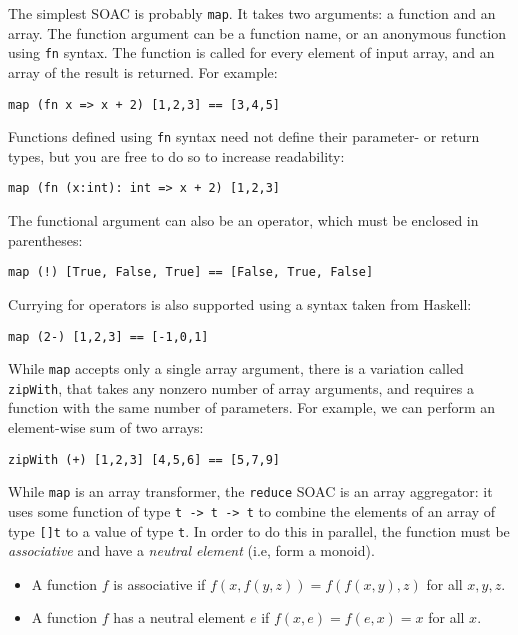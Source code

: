 \documentclass[11pt]{book}
\begin{document}
The simplest SOAC is probably \texttt{map}.  It takes two arguments: a
function and an array.  The function argument can be a function name,
or an anonymous function using \texttt{fn} syntax.  The function is
called for every element of input array, and an array of the result is
returned.  For example:

\begin{lstlisting}
map (fn x => x + 2) [1,2,3] == [3,4,5]
\end{lstlisting}

Functions defined using \texttt{fn} syntax need not define their
parameter- or return types, but you are free to do so to increase
readability:

\begin{lstlisting}
map (fn (x:int): int => x + 2) [1,2,3]
\end{lstlisting}

The functional argument can also be an operator, which must be
enclosed in parentheses:

\begin{lstlisting}
map (!) [True, False, True] == [False, True, False]
\end{lstlisting}

Currying for operators is also supported using a syntax taken from
Haskell:

\begin{lstlisting}
map (2-) [1,2,3] == [-1,0,1]
\end{lstlisting}

While \texttt{map} accepts only a single array argument, there is a
variation called \texttt{zipWith}, that takes any nonzero number of
array arguments, and requires a function with the same number of
parameters.  For example, we can perform an element-wise sum of two
arrays:

\begin{lstlisting}
zipWith (+) [1,2,3] [4,5,6] == [5,7,9]
\end{lstlisting}

While \texttt{map} is an array transformer, the \texttt{reduce} SOAC
is an array aggregator: it uses some function of type \texttt{t -> t
  -> t} to combine the elements of an array of type \texttt{[]t} to a
value of type \texttt{t}.  In order to do this in parallel, the
function must be \textit{associative} and have a \textit{neutral
  element} (i.e, form a monoid).

\begin{itemize}
\item A function $f$ is associative if $f(x,f(y,z)) = f(f(x,y),z)$ for
  all $x,y,z$.
\item A function $f$ has a neutral element $e$ if
  $f(x,e) = f(e,x) = x$ for all $x$.
\end{itemize}
\end{document}
